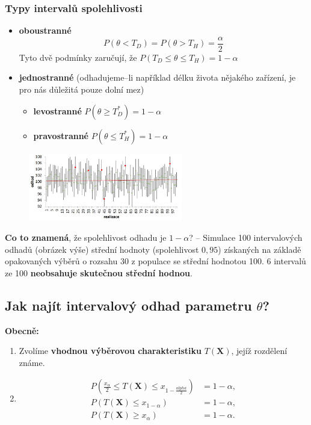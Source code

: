 \subsubsection*{Typy intervalů spolehlivosti}
	\begin{itemize}
		\item \textbf{oboustranné} 
		\begin{equation*}
				P(\theta < T_D) = P(\theta > T_H) = \frac{\alpha}{2}
		\end{equation*}
		Tyto dvě podmínky zaručují, že $P(T_D \leq \theta \leq T_H) = 1 - \alpha$
		\item \textbf{jednostranné} (odhadujeme--li například délku života nějakého zařízení, je pro nás důležitá pouze dolní mez)
		\begin{itemize}
			\item \textbf{levostranné} $P(\theta \geq T_D^*) = 1 - \alpha$
			\item \textbf{pravostranné} $P(\theta \leq T_H^*) = 1 - \alpha$
		\end{itemize}
	\end{itemize}
\begin{figure}[H]
\centering
\includegraphics[width=0.6\textwidth]{assets/14_spolehlivost_odhadu}
\end{figure}
\textbf{Co to znamená}, že spolehlivost odhadu je $1- \alpha$? -- Simulace 100 intervalových odhadů  (obrázek výše) střední hodnoty (spolehlivost $0,95$) získaných na základě opakovaných výběrů o rozsahu 30 z populace se střední hodnotou 100. 6 intervalů ze 100 \textbf{neobsahuje skutečnou střední hodnou}.
\subsection{Jak najít intervalový odhad parametru $\theta$?}
\textbf{Obecně:}
\begin{enumerate}
	\item Zvolíme \textbf{vhodnou výběrovou charakteristiku} $T(\mathbf{X})$, jejíž rozdělení známe.
	\item \begin{equation*}
			\begin{split}
				P(\frac{x_\alpha}{2} \leq T(\mathbf{X}) \leq x_{1 - \frac{alpha}{2}}) &= 1 - \alpha, \\
				P(T(\mathbf{X}) \leq x_{1-\alpha}) &= 1 - \alpha, \\
				P(T(\mathbf{X}) \geq x_\alpha) &= 1 - \alpha.	
			\end{split}
		\end{equation*}
\end{enumerate}

